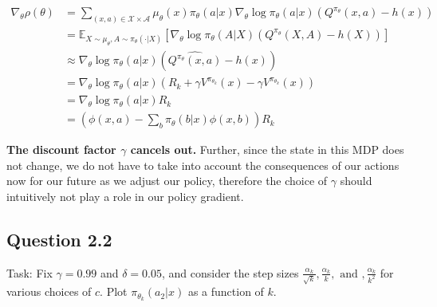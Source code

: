 \documentclass[a4paper, 11pt]{article} %
\begin{document}
\begin{align} \nabla_{\theta} \rho(\theta) 
&=\sum_{(x, a) \in \mathcal{X} \times \mathcal{A}} \mu_{\theta}(x) \pi_{\theta}(a | x) \nabla_{\theta} \log \pi_{\theta}(a | x)\left(Q^{\pi_\theta}(x, a)-h(x)\right) \\
&=\mathbb{E}_{X \sim \mu_{\theta}, A \sim \pi_{\theta}(\cdot | X)}\left[\nabla_{\theta} \log \pi_{\theta}(A | X)\left(Q^{\pi_{\theta}}(X, A)-h(X)\right)\right] \\
&\approx \nabla_{\theta} \log \pi_{\theta}(a | x)  \left(\widehat{Q^{\pi_{\theta}}(x, a)}-h(x)\right) \\
&=\nabla_{\theta} \log \pi_{\theta}(a | x)  \left(R_{k}+\gamma V^{\pi_{\theta_{k}}}(x) - \gamma V^{\pi_{\theta_{k}}}(x)\right) \\
&=\nabla_{\theta} \log \pi_{\theta}(a | x)  R_{k} \\
&=\left(  \phi(x, a)-\sum_{b} \pi_{\theta}(b|x) \phi(x, b)\right)R_{k} 
\end{align}

\textbf{The discount factor $\gamma$ cancels out.} Further, since the state in this MDP does not change, we do not have to take into account the consequences of our actions now for our future as we adjust our policy, therefore the choice of  $\gamma$ should intuitively not play a role in our policy gradient.

\subsection*{Question 2.2}

Task: Fix $\gamma = 0.99$ and $\delta = 0.05$, and consider the step sizes $\frac{\alpha_{k}}{\sqrt{k}} ,\frac{\alpha_{k}}{k}, \text { and },\frac{\alpha_{k}}{k^{2}}$ for various choices of $c$. Plot $\pi_{\theta_{k}}(a_{2}|x)$ as a function of $k$. \\
\end{document}
